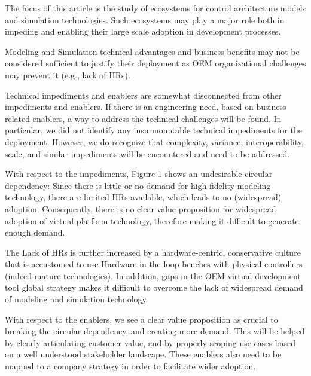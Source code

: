 The focus of this article is the study of ecosystems for control architecture models and simulation technologies.
Such ecosystems
may play a major role both in impeding and enabling their large scale adoption in development processes.

Modeling and Simulation technical advantages and business benefits may not be considered sufficient to justify their deployment as OEM organizational challenges may prevent it (e.g., lack of HRs).

Technical impediments and enablers are somewhat disconnected from other impediments and enablers. If there is an engineering need, based on business related enablers, a way to address the technical challenges will be found. In particular, we did not identify any insurmountable technical impediments for the deployment. However, we do recognize that complexity, variance, interoperability, scale, and similar impediments will be encountered and need to be addressed.

With respect to the impediments, Figure 1 shows an undesirable circular dependency: Since there is little or no demand for high fidelity modeling technology, there are limited HRs available, which leads to no (widespread) adoption. Consequently, there is no clear value proposition for widespread adoption of virtual platform technology, therefore making it difficult to generate enough demand.

The Lack of HRs is further increased by a hardware-centric, conservative culture that is accustomed to use Hardware in the loop benches with physical controllers (indeed mature technologies). In addition, gaps in the OEM virtual development tool global strategy makes it difficult to overcome the lack of widespread demand of modeling and simulation technology

With respect to the enablers, we see a clear value proposition as crucial to breaking the circular dependency, and creating more demand. This will be helped by clearly articulating customer value, and by properly scoping use cases based on a well understood stakeholder landscape. These enablers also need to be mapped to a company strategy in order to facilitate wider adoption. 

